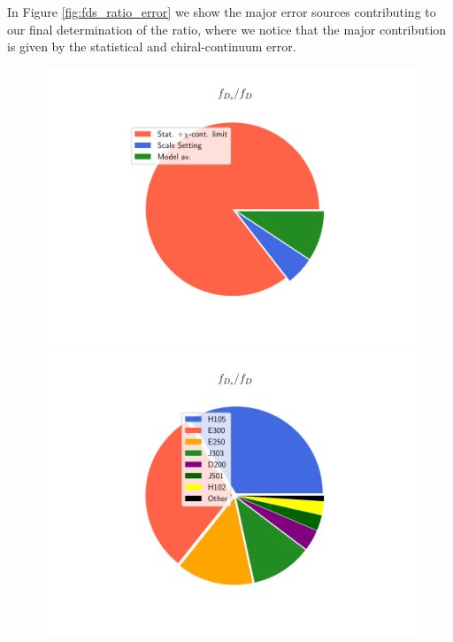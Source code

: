  In Figure \ref{fig:fds_ratio_error}  we show the major error sources contributing to our final determination of the ratio, where we notice that the major contribution is given by the statistical and chiral-continuum error.


\begin{figure}
\begin{center}
\begin{minipage}{.4\linewidth}
\includegraphics[width=\linewidth]{././cap6/figs/fds/error_pie_ratio_fds.pdf}
\end{minipage}
\hspace{15mm}
\begin{minipage}{.8\linewidth}
\includegraphics[width=\linewidth]{././cap6/figs/fds/error_pie_ratio_fds_statonly.pdf}

\end{minipage}
\end{center}
\end{figure}
